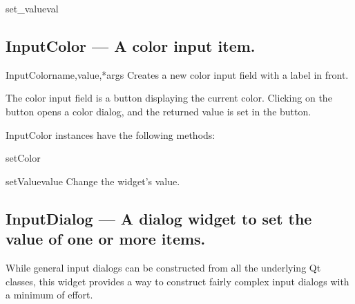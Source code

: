 \begin{funcdesc}{set_value}{val}

\end{funcdesc}

\subsection{InputColor --- A color input item.}


\begin{classdesc}{InputColor}{name,value,*args}
Creates a new color input field with a label in front.

        The color input field is a button displaying the current color.
        Clicking on the button opens a color dialog, and the returned
        value is set in the button.
        
\end{classdesc}

InputColor instances have the following methods:

\begin{funcdesc}{setColor}{}

\end{funcdesc}

\begin{funcdesc}{setValue}{value}
Change the widget's value.
\end{funcdesc}

\subsection{InputDialog --- A dialog widget to set the value of one or more items.}
    While general input dialogs can be constructed from all the underlying
    Qt classes, this widget provides a way to construct fairly complex
    input dialogs with a minimum of effort.
    

